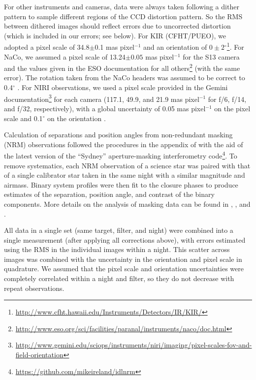\documentclass[twocolumn]{aastex62}
\newcommand{\degree}{$^{\circ}$}
\begin{document}
For other instruments and cameras, data were always taken following a dither pattern to sample different regions of the CCD distortion pattern. So the RMS between dithered images should reflect errors due to uncorrected distortion (which is included in our errors; see below). For KIR (CFHT/PUEO), we adopted a pixel scale of 34.8$\pm$0.1 mas pixel$^{-1}$ \citep{2003ApJ...589..410S} and an orientation of $0\pm2$\degree \footnote{\href{http://www.cfht.hawaii.edu/Instruments/Detectors/IR/KIR/}{http://www.cfht.hawaii.edu/Instruments/Detectors/IR/KIR/}}. For NaCo, we assumed a pixel scale of 13.24$\pm0.05$ mas pixel$^{-1}$ for the S13 camera \citep{2003A&A...411..157M,2005A&A...435L..13N} and the values given in the ESO documentation for all others\footnote{\href{http://www.eso.org/sci/facilities/paranal/instruments/naco/doc.html}{http://www.eso.org/sci/facilities/paranal/instruments/naco/doc.html}} (with the same error). The rotation taken from the NaCo headers was assumed to be correct to 0.4$^{\circ}$ \citep{Sef2008}. For NIRI observations, we used a pixel scale provided in the Gemini documentation\footnote{\href{http://www.gemini.edu/sciops/instruments/niri/imaging/pixel-scales-fov-and-field-orientation}{http://www.gemini.edu/sciops/instruments/niri/imaging/pixel-scales-fov-and-field-orientation}} for each camera (117.1, 49.9, and 21.9 mas pixel$^{-1}$ for f/6, f/14, and f/32, respectively), with a global uncertainty of 0.05 mas pixel$^{-1}$ on the pixel scale and 0.1$^{\circ}$ on the orientation \citep{2004ApJ...614..235B}. 

Calculation of separations and position angles from non-redundant masking (NRM) observations followed the procedures in the appendix of \citet{Kraus2008} with the aid of the latest version of the ``Sydney'' aperture-masking interferometry code\footnote{\href{https://github.com/mikeireland/idlnrm}{https://github.com/mikeireland/idlnrm}}. To remove systematics, each NRM observation of a science star was paired with that of a single calibrator star taken in the same night with a similar magnitude and airmass. Binary system profiles were then fit to the closure phases to produce estimates of the separation, position angle, and contrast of the binary components. More details on the analysis of masking data can be found in \citet{2006ApJ...650L.131L}, \citet{Kraus2008}, and \citet{2012ApJ...744..120E}.

All data in a single set (same target, filter, and night) were combined into a single measurement (after applying all corrections above), with errors estimated using the RMS in the individual images within a night. This scatter across images was combined with the uncertainty in the orientation and pixel scale in quadrature. We assumed that the pixel scale and orientation uncertainties were completely correlated within a night and filter, so they do not decrease with repeat observations. 
\end{document}
